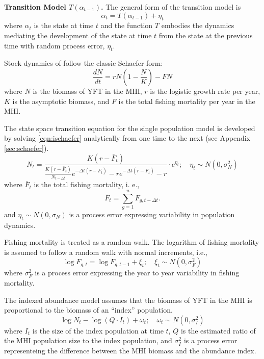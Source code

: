 \documentclass[12pt,letterpaper,twoside]{article}
\begin{document}
{\bf Transition Model $T(\alpha_{t-1})$.}
The general form of the transition model is
\begin{equation}
\alpha_t=T(\alpha_{t-1}) + \eta_t
\end{equation}
where $\alpha_t$ is the state at time $t$ and 
the function $T$ embodies the dynamics mediating the
development of the state at time $t$ from the state at the previous
time with random process error, $\eta_t$.

Stock dynamics of follow the classic Schaefer form:
\begin{equation}
\label{eqn:ischaefer}
\frac{dN}{dt} = rN(1-\frac{N}{K}) - FN
\end{equation}
where $N$ is the biomass of YFT in the MHI, 
$r$ is the logistic growth rate per year,
$K$ is the asymptotic biomass, and
$F$ is the total fishing mortality per year in the MHI.

The state space transition equation for the single population model is
developed by solving \ref{eqn:ischaefer} analytically from one time to
the next (see Appendix \ref{sec:schaefer}).
\begin{equation}
\label{eqn:intschaeferA}
N_t = \frac{K(r-\bar{F}_t)}{\frac{K(r-\bar{F}_t)}{N_{t-\Delta t}}e^{-\Delta
t(r-\bar{F}_t)}-re^{-\Delta t(r-\bar{F}_t)} -r} \cdot e^{\eta_t};
\quad \eta_t\sim N(0,\sigma^2_N)
\end{equation}
where 
$\bar{F}_t$ is the total fishing mortality, i. e.,
$$
\bar{F}_t =\sum_{g=1}^n F_{g,t-\Delta t}.
$$
and $\eta_t \sim N(0,\sigma_N)$ is a process error expressing
variability in population dynamics.

Fishing mortality is treated as a random walk.
The logarithm of fishing mortality is assumed to
follow a random walk with normal increments, i.e.,
\begin{equation}
\label{eqn:Fwalk}
\log F_{g,t} = \log F_{g,t-1} + \xi_t;\quad \xi_t\sim
N(0,\sigma^2_F)
\end{equation}
where  $\sigma^2_F$ is a process error expressing the year to year
variability in fishing mortality.

The indexed abundance model
assumes that the biomass of YFT in the MHI
is proportional to the biomass of an ``index'' population.
\begin{equation}
\log N_t - \log (Q\cdot I_t) + \omega_t;\quad \omega_t\sim N(0,\sigma^2_I)
\label{eqn:index}
\end{equation}
where
$I_t$ is the size of the index population at time $t$,
$Q$ is the estimated ratio of the MHI population size to the index
population,
and $\sigma^2_I$ is a process error representeing the difference
between the MHI biomass and the abundance index. 
\end{document}
